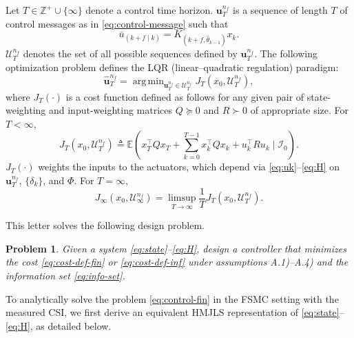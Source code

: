 \documentclass[journal,twoside,web]{ieeecolor}
\newtheorem{problem}{Problem}
\begin{document}
Let $T\in\mathbb{Z}^{+} \cup \{\infty\}$ denote a control time horizon. $\bm{u}_{T}^{n_f}$ is a sequence of length $T$ of control messages as in \eqref{eq:control-message} such that
\begin{equation}\label{eq:control-element}
    \bar{u}_{(k+f\mid k)} = K_{(k+f,\hat{\theta}_{k-1})}x_k.
\end{equation}
$\mathcal{U}_{T}^{n_f}$ denotes the set of all possible sequences defined by $\bm{u}_{T}^{n_f}$.
The following optimization problem defines
the LQR (linear–quadratic regulation) paradigm:
\begin{equation}\label{eq:control-fin}
    \hat{\bm{u}}_{T}^{n_f} = \mathop{\mathrm{arg\,min}}_{\bm{u}_{T}^{n_f} \in \mathcal{U}_{T}^{n_f}} J_{T}^{}(x_0,\mathcal{U}_{T}^{n_f}),
\end{equation}
where $J_{T}^{}(\cdot)$ is a cost function defined as follows for any given pair of state-weighting and input-weighting matrices $Q\succeq 0$ and $R \succ 0$ of appropriate size.
For $T<\infty$,
\begin{equation}\label{eq:cost-def-fin}
    J_{T}^{}(x_0,\mathcal{U}_{T}^{n_f}) \!\triangleq \mathbb{E}(x_T^{\top} Q x_T +\! \sum_{k=0}^{T-1} x_k^{\top} Q x_k + u_k^{\top}Ru_k \mid \mathcal{I}_0).
\end{equation}
$J_{T}^{}(\cdot)$ weights the inputs to the actuators, which depend via \eqref{eq:uk}–\eqref{eq:H} on $\bm{u}_{T}^{n_f}$, $\{\delta_k\}$, and $\mathit{\Phi}$. For $T=\infty$, 
\begin{equation}\label{eq:cost-def-inf}
    J_{\infty}^{}(x_0,\mathcal{U}_{\infty}^{n_f}) = \limsup_{T\to\infty} \frac{1}{T} J_{T}^{}(x_0,\mathcal{U}_{T}^{n_f}).
\end{equation}

This letter solves the following design problem.

\begin{problem}\label{problem:lqr}
   Given a system \eqref{eq:state}–\eqref{eq:H}, design a controller that minimizes the cost \eqref{eq:cost-def-fin} or \eqref{eq:cost-def-inf} under assumptions A.1)–A.4) and the information set \eqref{eq:info-set}.
\end{problem}

To analytically solve the problem \eqref{eq:control-fin} in the FSMC setting with the measured CSI, we first derive an equivalent HMJLS representation of \eqref{eq:state}–\eqref{eq:H}, as detailed below. 
\end{document}
